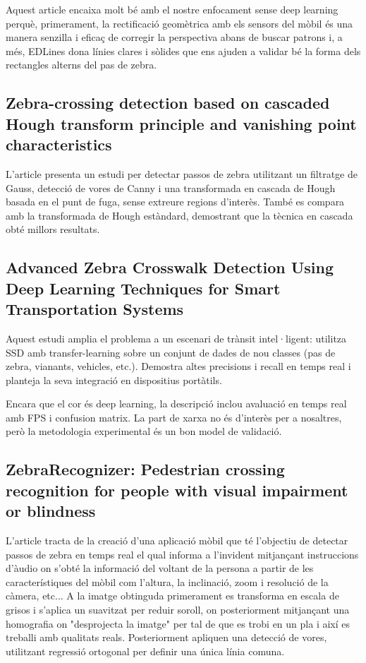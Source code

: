 \documentclass[10pt,a4paper,twocolumn,twoside]{article}
\begin{document}
Aquest article encaixa molt bé amb el nostre enfocament sense deep learning perquè, primerament, la rectificació geomètrica amb els sensors del mòbil és una manera senzilla i eficaç de corregir la perspectiva abans de buscar patrons i, a més, EDLines dona línies clares i sòlides que ens ajuden a validar bé la forma dels rectangles alterns del pas de zebra.

\subsection*{Zebra-crossing detection based on cascaded Hough transform principle and vanishing point characteristics \cite{CascadedHough}}

L'article presenta un estudi per detectar passos de zebra utilitzant un filtratge de Gauss, detecció de vores de Canny i una transformada en cascada de Hough basada en el punt de fuga, sense extreure regions d'interès. També es compara amb la transformada de Hough estàndard, demostrant que la tècnica en cascada obté millors resultats.

\subsection*{Advanced Zebra Crosswalk Detection Using Deep Learning Techniques for Smart Transportation Systems \cite{ZebraImageProcessing}}

Aquest estudi amplia el problema a un escenari de trànsit intel·ligent: utilitza SSD amb transfer-learning sobre un conjunt de dades de nou classes (pas de zebra, vianants, vehicles, etc.). Demostra altes precisions i recall en temps real i planteja la seva integració en dispositius portàtils.

Encara que el cor és deep learning, la descripció inclou avaluació en temps real amb FPS i confusion matrix. La part de xarxa no és d’interès per a nosaltres, però la metodologia experimental és un bon model de validació.

\subsection*{ZebraRecognizer: Pedestrian crossing recognition for people with visual impairment or blindness \cite{RobustPedestrian}}
L'article tracta de la creació d'una aplicació mòbil que té l'objectiu de detectar passos de zebra en temps real el qual informa a l'invident mitjançant instruccions d'àudio on s'obté la informació del voltant de la persona a partir de les característiques del mòbil com l'altura, la inclinació, zoom i resolució de la càmera, etc... A la imatge obtinguda primerament es transforma en escala de grisos i s'aplica un suavitzat per reduir soroll, on posteriorment mitjançant una homografia on "desprojecta la imatge" per tal de que es trobi en un pla i així es treballi amb qualitats reals. Posteriorment apliquen una detecció de vores, utilitzant regressió ortogonal per definir una única línia comuna.
\end{document}
